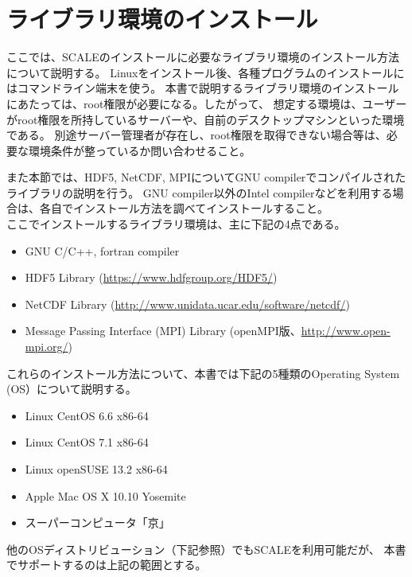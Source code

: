 \chapter{ライブラリ環境のインストール}
\label{sec:env_setting}

ここでは、SCALEのインストールに必要なライブラリ環境のインストール方法について説明する。
Linuxをインストール後、各種プログラムのインストールにはコマンドライン端末を使う。
本書で説明するライブラリ環境のインストールにあたっては、root権限が必要になる。したがって、
想定する環境は、ユーザーがroot権限を所持しているサーバーや、自前のデスクトップマシンといった環境である。
別途サーバー管理者が存在し、root権限を取得できない場合等は、必要な環境条件が整っているか問い合わせること。

また本節では、HDF5, NetCDF, MPIについてGNU compilerでコンパイルされたライブラリの説明を行う。
GNU compiler以外のIntel compilerなどを利用する場合は、各自でインストール方法を調べてインストールすること。\\

\noindent ここでインストールするライブラリ環境は、主に下記の4点である。
\begin{itemize}
\item GNU C/C++, fortran compiler
\item HDF5 Library (\url{https://www.hdfgroup.org/HDF5/})
\item NetCDF Library (\url{http://www.unidata.ucar.edu/software/netcdf/})
\item Message Passing Interface (MPI) Library (openMPI版、\url{http://www.open-mpi.org/})
\end{itemize}
これらのインストール方法について、本書では下記の5種類のOperating System (OS）について説明する。
\begin{itemize}
\item Linux CentOS 6.6 x86-64
\item Linux CentOS 7.1 x86-64
\item Linux openSUSE 13.2 x86-64
\item Apple Mac OS X 10.10 Yosemite
\item スーパーコンピュータ「京」
\end{itemize}
他のOSディストリビューション（下記参照）でもSCALEを利用可能だが、
本書でサポートするのは上記の範囲とする。\\

